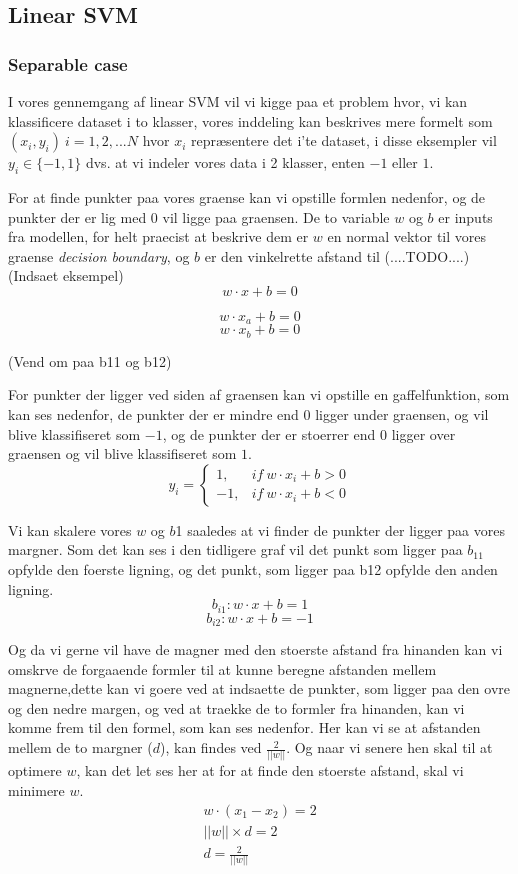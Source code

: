 \documentclass{article}
\begin{document}
\subsection{Linear SVM}
\subsubsection{Separable case}
I vores gennemgang af linear SVM vil vi kigge paa et problem hvor, vi kan klassificere dataset i to klasser, vores inddeling kan beskrives mere formelt som $(x_i,y_i) \ i=1,2,...N$ hvor $x_i$ repræsentere det i'te dataset, i disse eksempler vil $y_i \in \{-1,1\}$ dvs. at vi indeler vores data i 2 klasser, enten $-1$ eller $1$.

For at finde punkter paa vores graense kan vi opstille formlen nedenfor, og de punkter der er lig med $0$ vil ligge paa graensen. De to variable $w$ og $b$ er inputs fra modellen, for helt praecist at beskrive dem er $w$ en normal vektor til vores graense \textit{decision boundary}, og $b$ er den vinkelrette afstand til  (....TODO....) 
(Indsaet eksempel)
$$w \cdot x + b = 0$$

$$w \cdot x_a + b = 0$$
$$w \cdot x_b + b = 0$$

(Vend om paa b11 og b12)

For punkter der ligger ved siden af graensen kan vi opstille en gaffelfunktion, som kan ses nedenfor, de punkter der er mindre end $0$ ligger under graensen, og vil blive klassifiseret som $-1$, og de punkter der er stoerrer end $0$ ligger over graensen og vil blive klassifiseret som $1$. 
$$
   y_i = \left\{
     \begin{array}{lr}
       1, & if \ w \cdot x_i + b > 0 \\
       -1, & if \ w \cdot x_i + b < 0
     \end{array}
   \right.
$$

Vi kan skalere vores $w$ og $b$1 saaledes at vi finder de punkter der ligger paa vores margner. Som det kan ses i den tidligere graf vil det punkt som ligger paa $b_{11}$ opfylde den foerste ligning, og det punkt, som ligger paa b12 opfylde den anden ligning. 
$$b_{i1}: w \cdot x + b = 1$$
$$b_{i2}: w \cdot x + b = -1$$

Og da vi gerne vil have de magner med den stoerste afstand fra hinanden kan vi omskrve de forgaaende formler til at kunne beregne afstanden mellem magnerne,dette kan vi goere ved at indsaette de punkter, som ligger paa den ovre og den nedre margen, og ved at traekke de to formler fra hinanden, kan vi komme frem til den formel, som kan ses nedenfor. Her kan vi se at afstanden mellem de to margner ($d$), kan findes ved $\frac{2}{||w||}$. Og naar vi senere hen skal til at optimere $w$, kan det let ses her at for at finde den stoerste afstand, skal vi minimere $w$. 
\begin{align*}
w \cdot (x_1 - x_2) = 2 \\
||w|| \times d = 2 \\
d = \frac{2}{||w||} \\
\end{align*}
\end{document}
